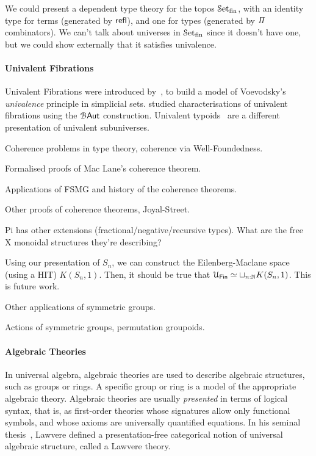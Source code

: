 We could present a dependent type theory for the topos $\SetFin$, with an identity type for terms (generated by
$\refl$), and one for types (generated by $\mathit{\Pi}$ combinators). We can't talk about universes in $\SetFin$ since it
doesn't have one, but we could show externally that it satisfies univalence.

\paragraph{Univalent Fibrations} Univalent Fibrations were introduced by~\citet*{kapulkinUnivalenceSimplicialSets2018},
to build a model of Voevodsky's \emph{univalence} principle in simplicial sets.
\citet{christensenCharacterizationUnivalentFibrations2015} studied characterisations of univalent fibrations using the
$\BAut$ construction. Univalent typoids~\cite{petrakisUnivalentTypoids2019a} are a different presentation of univalent
subuniverses.

Coherence problems in type theory, coherence via Well-Foundedness.

Formalised proofs of Mac Lane's coherence theorem.

Applications of FSMG and history of the coherence theorems.

Other proofs of coherence theorems, Joyal-Street.

Pi has other extensions (fractional/negative/recursive types).
What are the free X monoidal structures they're describing?

Using our presentation of $S_{n}$, we can construct the Eilenberg-Maclane space (using a HIT) $K(S_{n},1)$. Then, it
should be true that $\UFin \eqv \sqcup_{n:\Nat} K(S_{n},1)$. This is future work.

Other applications of symmetric groups.

Actions of symmetric groups, permutation groupoids.

\paragraph{Algebraic Theories} In universal algebra, algebraic theories are used to describe algebraic structures, such
as groups or rings. A specific group or ring is a model of the appropriate algebraic theory. Algebraic theories are
usually \emph{presented} in terms of logical syntax, that is, as first-order theories whose signatures allow only
functional symbols, and whose axioms are universally quantified equations. In his seminal
thesis~\cite{lawvereFUNCTORIALSEMANTICSALGEBRAIC1963}, Lawvere defined a presentation-free categorical notion of
universal algebraic structure, called a Lawvere theory.

